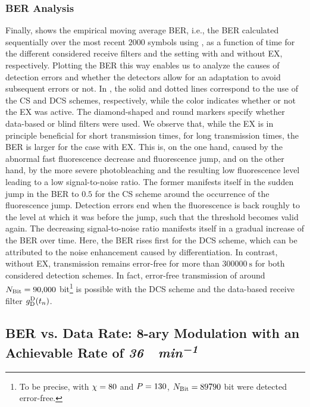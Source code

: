 \subsubsection{BER Analysis}\label{sssec:ber_long}
\scaleSubsubsectionBelow
%
Finally,  shows the empirical moving average \ac{BER}, i.e., the \ac{BER} calculated sequentially over the most recent $\num{2000}$ symbols using , as a function of time for the different considered receive filters and the setting with and without \ac{EX}, respectively. Plotting the \ac{BER} this way enables us to analyze the causes of detection errors and whether the detectors allow for an adaptation to avoid subsequent errors or not. In , the solid and dotted lines correspond to the use of the \ac{CS} and \ac{DCS} schemes, respectively, while the color indicates whether or not the \ac{EX} was active. The diamond-shaped and round markers specify whether data-based or blind filters were used. We observe that, while the \ac{EX} is in principle beneficial for short transmission times, for long transmission times, the \ac{BER} is larger for the case with \ac{EX}. This is, on the one hand, caused by the abnormal fast fluorescence decrease and fluorescence jump, and on the other hand, by the more severe photobleaching and the resulting low fluorescence level leading to a low signal-to-noise ratio. The former manifests itself in the sudden jump in the \ac{BER} to $0.5$ for the \ac{CS} scheme around the occurrence of the fluorescence jump. Detection errors end when the fluorescence is back roughly to the level at which it was before the jump, such that the threshold becomes valid again. The decreasing signal-to-noise ratio manifests itself in a gradual increase of the \ac{BER} over time. Here, the \ac{BER} rises first for the \ac{DCS} scheme, which can be attributed to the noise enhancement caused by differentiation. In contrast, without \ac{EX}, transmission remains error-free for more than $\SI{300000}{\s}$ for both considered detection schemes. In fact, error-free transmission of around $N_{\mathrm{Bit}} = \num{90000}$ bit\footnote{To be precise, with $\chi = 80$ and $P = 130$, $N_{\mathrm{Bit}} = 89790$ bit were detected error-free.} is possible with the \ac{DCS} scheme and the data-based receive filter $g^{\mathrm{D}}_{\mathrm{D}}(t_n)$.
%
\scaleSubsection
{ %
\subsection{BER vs. Data Rate: 8-ary Modulation with an Achievable Rate of \textit{\SI{36}{\bit \per \minute}}}\label{sec:higher_order_modulation_rocks}}
